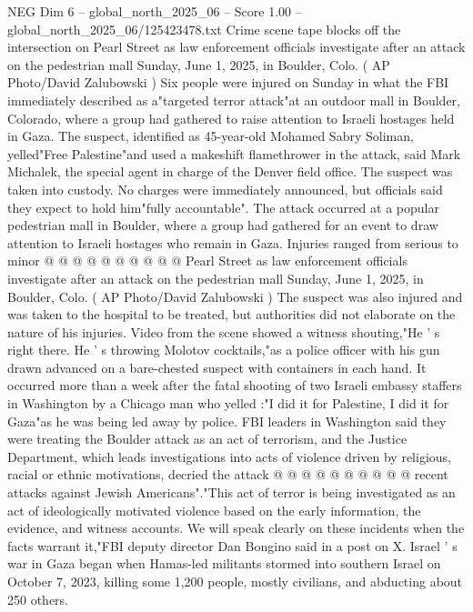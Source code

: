 \begin{textsample}{NEG Dim 6 – global\_north\_2025\_06 – Score 1.00 – global\_north\_2025\_06/125423478.txt}  \label{ex:f6_neg_419}
Crime scene tape blocks off the intersection on Pearl Street as law enforcement officials investigate after an attack on the pedestrian mall Sunday, June 1, 2025, in Boulder, Colo. ( AP Photo/David Zalubowski ) Six people were injured on Sunday in what the FBI immediately described as a"targeted terror attack"at an outdoor mall in Boulder, Colorado, where a group had gathered to raise attention to Israeli hostages held in Gaza.
The suspect, identified as 45-year-old Mohamed Sabry Soliman, yelled"Free Palestine"and used a makeshift flamethrower in the attack, said Mark Michalek, the special agent in charge of the Denver field office.
The suspect was taken into custody.
No charges were immediately announced, but officials said they expect to hold him"fully accountable".
The attack occurred at a popular pedestrian mall in Boulder, where a group had gathered for an event to draw attention to Israeli hostages who remain in Gaza.
Injuries ranged from serious to minor @ @ @ @ @ @ @ @ @ @ Pearl Street as law enforcement officials investigate after an attack on the pedestrian mall Sunday, June 1, 2025, in Boulder, Colo. ( AP Photo/David Zalubowski ) The suspect was also injured and was taken to the hospital to be treated, but authorities did not elaborate on the nature of his injuries.
Video from the scene showed a witness shouting,"He ' s right there.
He ' s throwing Molotov cocktails,"as a police officer with his gun drawn advanced on a bare-chested suspect with containers in each hand.
It occurred more than a week after the fatal shooting of two Israeli embassy staffers in Washington by a Chicago man who yelled :"I did it for Palestine, I did it for Gaza"as he was being led away by police.
FBI leaders in Washington said they were treating the Boulder attack as an act of terrorism, and the Justice Department, which leads investigations into acts of violence driven by religious, racial or ethnic motivations, decried the attack @ @ @ @ @ @ @ @ @ @ recent attacks against Jewish Americans"."This act of terror is being investigated as an act of ideologically motivated violence based on the early information, the evidence, and witness accounts.
We will speak clearly on these incidents when the facts warrant it,"FBI deputy director Dan Bongino said in a post on X.
Israel ' s war in Gaza began when Hamas-led militants stormed into southern Israel on October 7, 2023, killing some 1,200 people, mostly civilians, and abducting about 250 others.

\end{textsample}
